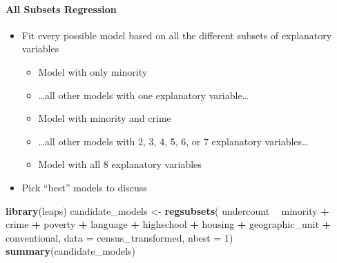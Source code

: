 \documentclass[landscape]{article}
\newenvironment{Shaded}{\begin{snugshade}}{\end{snugshade}}
\newcommand{\KeywordTok}[1]{\textcolor[rgb]{0.13,0.29,0.53}{\textbf{#1}}}
\newcommand{\DataTypeTok}[1]{\textcolor[rgb]{0.13,0.29,0.53}{#1}}
\newcommand{\DecValTok}[1]{\textcolor[rgb]{0.00,0.00,0.81}{#1}}
\newcommand{\StringTok}[1]{\textcolor[rgb]{0.31,0.60,0.02}{#1}}
\newcommand{\OperatorTok}[1]{\textcolor[rgb]{0.81,0.36,0.00}{\textbf{#1}}}
\newcommand{\NormalTok}[1]{#1}
\providecommand{\tightlist}{%
  \setlength{\itemsep}{0pt}\setlength{\parskip}{0pt}}
\let\oldparagraph\paragraph
\renewcommand{\paragraph}[1]{\oldparagraph{#1}\mbox{}}
\begin{document}
\newpage

\paragraph{All Subsets Regression}\label{all-subsets-regression}

\begin{itemize}
\tightlist
\item
  Fit every possible model based on all the different subsets of
  explanatory variables

  \begin{itemize}
  \tightlist
  \item
    Model with only minority
  \item
    \ldots{}all other models with one explanatory variable\ldots{}
  \item
    Model with minority and crime
  \item
    \ldots{}all other models with 2, 3, 4, 5, 6, or 7 explanatory
    variables\ldots{}
  \item
    Model with all 8 explanatory variables
  \end{itemize}
\item
  Pick ``best'' models to discuss
\end{itemize}

\begin{Shaded}
\begin{Highlighting}[]
\KeywordTok{library}\NormalTok{(leaps)}
\NormalTok{candidate_models <-}\StringTok{ }\KeywordTok{regsubsets}\NormalTok{(}
\NormalTok{  undercount }\OperatorTok{~}\StringTok{ }\NormalTok{minority }\OperatorTok{+}\StringTok{ }\NormalTok{crime }\OperatorTok{+}\StringTok{ }\NormalTok{poverty }\OperatorTok{+}\StringTok{ }\NormalTok{language }\OperatorTok{+}\StringTok{ }\NormalTok{highschool }\OperatorTok{+}\StringTok{ }\NormalTok{housing }\OperatorTok{+}\StringTok{ }\NormalTok{geographic_unit }\OperatorTok{+}\StringTok{ }\NormalTok{conventional,}
  \DataTypeTok{data =}\NormalTok{ census_transformed,}
  \DataTypeTok{nbest =} \DecValTok{1}\NormalTok{)}
\KeywordTok{summary}\NormalTok{(candidate_models)}
\end{Highlighting}
\end{Shaded}
\end{document}

